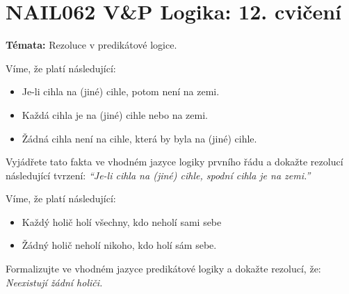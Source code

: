 \documentclass[a4paper,12pt]{article}
\begin{document}
\section*{NAIL062 V\&P Logika: 12. cvičení}

\textbf{Témata:}
Rezoluce v predikátové logice.



\medskip\begin{problem} Víme, že platí následující:
    \begin{itemize}\it
        \item Je-li cihla na (jiné) cihle, potom není na zemi.
        \item Každá cihla je na (jiné) cihle nebo na zemi.
        \item Žádná cihla není na cihle, která by byla na (jiné) cihle.
    \end{itemize}
    Vyjádřete tato fakta ve vhodném jazyce logiky prvního řádu a dokažte rezolucí následující tvrzení: {\it ``Je-li cihla na (jiné) cihle, spodní cihla je na zemi.''}
\end{problem}
        
    
\medskip\begin{problem} Víme, že platí následující:
    \begin{itemize}\it
        \item Každý holič holí všechny, kdo neholí sami sebe
        \item Žádný holič neholí nikoho, kdo holí sám sebe.
    \end{itemize}
    Formalizujte ve vhodném jazyce predikátové logiky a dokažte rezolucí, že: {\it Neexistují žádní holiči.}
\end{problem}
\end{document}
